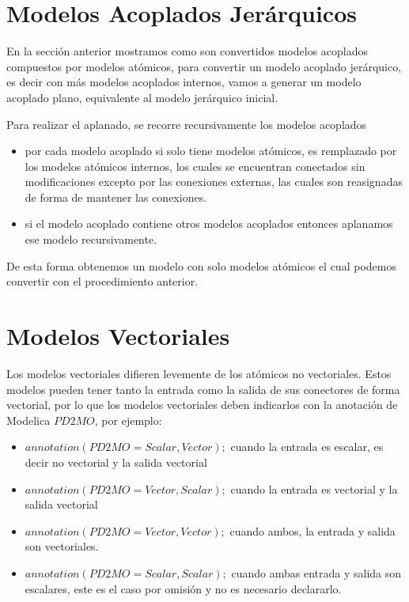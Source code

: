 \documentclass[a4paper,	11pt]{report}
\begin{document}
\section{Modelos Acoplados Jerárquicos}

En la sección anterior mostramos como son convertidos modelos acoplados compuestos por modelos atómicos, para convertir un modelo acoplado jerárquico, es decir con más modelos acoplados internos, vamos a generar un modelo acoplado plano, equivalente al modelo jerárquico inicial.

Para realizar el aplanado, se recorre recursivamente los modelos acoplados

\begin{itemize}
\item por cada modelo acoplado si solo tiene modelos atómicos, es remplazado por los modelos atómicos internos, los cuales se encuentran conectados sin modificaciones excepto por las conexiones externas, las cuales son reasignadas de forma de mantener las conexiones.
\item si el modelo acoplado contiene otros modelos acoplados entonces aplanamos ese modelo recursivamente.
\end{itemize} 

De esta forma obtenemos un modelo con solo modelos atómicos el cual podemos convertir con el procedimiento anterior.

\section{Modelos Vectoriales}
Los modelos vectoriales difieren levemente de los atómicos no vectoriales. Estos modelos pueden tener tanto la entrada como la salida de sus conectores de forma vectorial, por lo que los modelos vectoriales deben indicarlos con la anotación de Modelica $PD2MO$, por ejemplo:
\begin{itemize}
\item $annotation(PD2MO = {Scalar, Vector});$ cuando la entrada es escalar, es decir no vectorial y la salida vectorial
\item $annotation(PD2MO = {Vector, Scalar});$ cuando la entrada es vectorial y la salida vectorial
\item $annotation(PD2MO = {Vector, Vector});$ cuando ambos, la entrada y salida son vectoriales.
\item $annotation(PD2MO = {Scalar, Scalar});$ cuando ambas entrada y salida son escalares, este es el caso por omisión y no es necesario declararlo.
\end{itemize}
\end{document}
